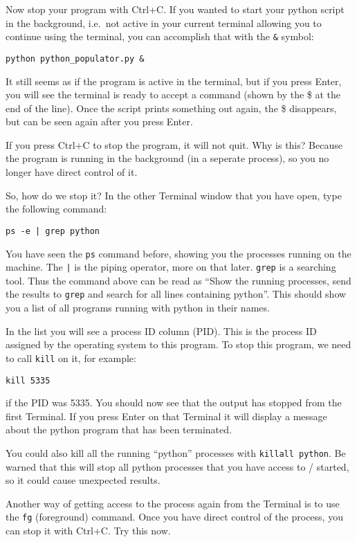 \documentclass[a4paper]{article}
\begin{document}
Now stop your program with Ctrl+C. If you wanted to start your python script in the background, i.e.\ not active in your current terminal allowing you to continue using the terminal, you can accomplish that with the \texttt{\&} symbol:
\begin{lstlisting}
python python_populator.py &
\end{lstlisting}

It still seems as if the program is active in the terminal, but if you press Enter, you will see the terminal is ready to accept a command (shown by the \$ at the end of the line). Once the script prints something out again, the \$ disappears, but can be seen again after you press Enter. 

If you press Ctrl+C to stop the program, it will not quit. Why is this? Because the program is running in the background (in a seperate process), so you no longer have direct control of it. 

So, how do we stop it? In the other Terminal window that you have open, type the following command: 
\begin{lstlisting}
ps -e | grep python
\end{lstlisting}
You have seen the \texttt{ps} command before, showing you the processes running on the machine. The \texttt{|} is the piping operator, more on that later. \texttt{grep} is a searching tool. Thus the command above can be read as ``Show the running processes, send the results to \texttt{grep} and search for all lines containing python''. This should show you a list of all programs running with python in their names. 

In the list you will see a process ID column (PID). This is the process ID assigned by the operating system to this program. To stop this program, we need to call \texttt{kill} on it, for example: 
\begin{lstlisting}
kill 5335
\end{lstlisting}
if the PID was 5335. You should now see that the output has stopped from the first Terminal. If you press Enter on that Terminal it will display a message about the python program that has been terminated. 

You could also kill all the running ``python'' processes with \texttt{killall python}. Be warned that this will stop all python processes that you have access to / started, so it could cause unexpected results. 

Another way of getting access to the process again from the Terminal is to use the \texttt{fg} (foreground) command. Once you have direct control of the process, you can stop it with Ctrl+C. Try this now. 
\end{document}
